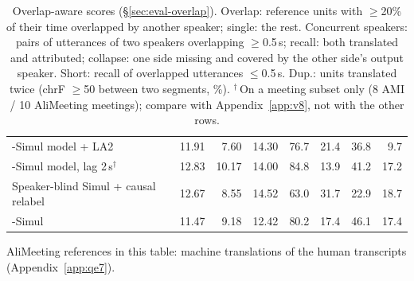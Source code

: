 \begin{table}[t]
\begin{tabular}{lrrrrrrr}
\sys{}-Simul model + LA2 & 11.91 & 7.60 & 14.30 & 76.7 & 21.4 & 36.8 & 9.7 \\
\sys{}-Simul model, lag 2\,s$^\dagger$ & 12.83 & 10.17 & 14.00 & 84.8 & 13.9 & 41.2 & 17.2 \\
Speaker-blind Simul + causal relabel & 12.67 & 8.55 & 14.52 & 63.0 & 31.7 & 22.9 & 18.7 \\
\sys{}-Simul & 11.47 & 9.18 & 12.42 & 80.2 & 17.4 & 46.1 & 17.4 \\
\bottomrule
\end{tabular}
\caption{Overlap-aware scores (\S\ref{sec:eval-overlap}). Overlap: reference units with $\ge$20\% of their time overlapped
by another speaker; single: the rest. Concurrent speakers: pairs of utterances of two speakers overlapping $\ge$0.5\,s;
recall: both translated and attributed; collapse: one side missing and covered by the other side's output speaker. Short:
recall of overlapped utterances $\le$0.5\,s. Dup.: units translated twice (chrF $\ge$50 between two segments, \%).
$^\dagger$\,On a meeting subset only (8 AMI / 10 AliMeeting meetings); compare with Appendix~\ref{app:v8}, not with the
other rows.}
\vspace{-2pt}\par\footnotesize AliMeeting references in this table: machine translations of the human transcripts (Appendix~\ref{app:qe7}).\label{tab:overlap8}
\end{table}
